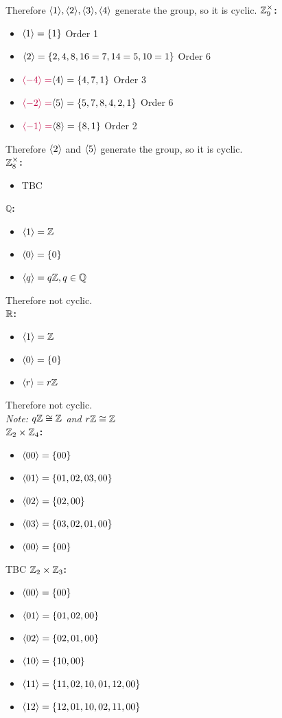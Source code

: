 \documentclass[openany]{report}
\begin{document}
Therefore $\langle 1 \rangle,\langle 2 \rangle, \langle 3 \rangle, \langle 4 \rangle$ generate the group, so it is cyclic.
\textbf{$\mathbb{Z}_9^\times$:}
\begin{itemize}
    \item $\langle 1 \rangle = \{1\}$ Order 1
    \item $\langle 2 \rangle = \{2,4,8,16=7,14=5,10=1\}$ Order 6
    \item $\textcolor{purple}{\langle -4 \rangle =}\langle 4 \rangle = \{4,7,1\}$ Order 3
    \item $\textcolor{purple}{\langle -2 \rangle =}\langle 5 \rangle = \{5,7,8,4,2,1\}$ Order 6
    \item $\textcolor{purple}{\langle -1 \rangle =}\langle 8 \rangle = \{8,1\}$ Order 2
\end{itemize}
Therefore $\langle 2 \rangle$ and $\langle 5 \rangle$ generate the group, so it is cyclic.\\[2ex]
\textbf{$\mathbb{Z}_8^\times$:}
\begin{itemize}
    \item TBC
\end{itemize}
\textbf{$\mathbb{Q}$:}
\begin{itemize}
    \item $\langle 1 \rangle = \mathbb{Z}$
    \item $\langle 0 \rangle = \{0\}$
    \item $\langle q \rangle = q\mathbb{Z}, q \in \mathbb{Q}$
\end{itemize}
Therefore not cyclic.\\[2ex]
\textbf{$\mathbb{R}$:}
\begin{itemize}
    \item $\langle 1 \rangle = \mathbb{Z}$
    \item $\langle 0 \rangle = \{0\}$
    \item $\langle r \rangle = r\mathbb{Z}$
\end{itemize}
Therefore not cyclic. \\[2ex]
\textit{Note: $q\mathbb{Z} \cong \mathbb{Z}$ and $r \mathbb{Z} \cong \mathbb{Z}$}\\[2ex]
\textbf{$\mathbb{Z}_2 \times \mathbb{Z}_4$:}
\begin{itemize}
    \item $\langle 00 \rangle = \{00\}$
    \item $\langle 01 \rangle = \{01, 02,03,00\}$
    \item $\langle 02 \rangle = \{02,00\}$
    \item $\langle 03 \rangle = \{03,02,01,00\}$
    \item $\langle 00 \rangle = \{00\}$ 
\end{itemize}
TBC
\textbf{$\mathbb{Z}_2 \times \mathbb{Z}_3$:}
\begin{itemize}
    \item $\langle 00 \rangle = \{00\}$
    \item $\langle 01 \rangle = \{01, 02, 00\}$
    \item $\langle 02 \rangle = \{02,01,00\}$
    \item $\langle 10 \rangle = \{10,00\}$
    \item $\langle 11 \rangle = \{11,02,10,01,12,00\}$
    \item $\langle 12 \rangle = \{12,01,10,02,11,00\}$
\end{itemize}
\end{document}
